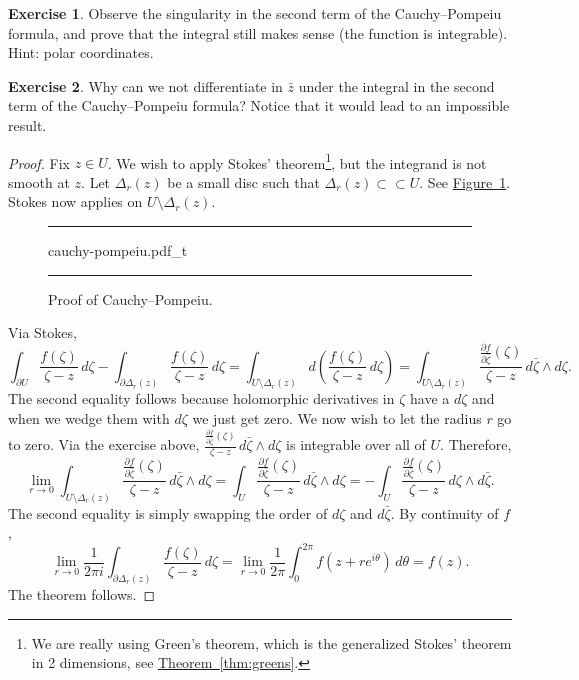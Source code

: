 \documentclass[12pt,openany]{book}
\theoremstyle{plain}
\theoremstyle{remark}
\theoremstyle{definition}
\newenvironment{exbox}{%
    \def\FrameCommand{\vrule width 1pt \relax\hspace{10pt}}%
    \MakeFramed{\advance\hsize-\width\FrameRestore}%
}{%
    \endMakeFramed
}
\newenvironment{myfig}{%
\begin{figure}[h!t]
\noindent\rule{\textwidth}{0.5pt}\vspace{12pt}\par\centering}%
{\par\noindent\rule{\textwidth}{0.5pt}
\end{figure}}
\theoremstyle{exercise}
\newtheorem{exercise}{Exercise}[section]
\theoremstyle{example}
\newcommand{\figureref}[1]{\hyperref[#1]{Figure~\ref*{#1}}}
\newcommand{\thmref}[1]{\hyperref[#1]{Theorem~\ref*{#1}}}
\begin{document}
\begin{exbox}
\begin{exercise}
Observe the singularity in the second term of the Cauchy--Pompeiu formula,
and prove that the integral still makes
sense (the function is integrable).  Hint: polar coordinates.
\end{exercise}

\begin{exercise}
Why can we not differentiate in $\bar{z}$ under the integral in the second
term of the Cauchy--Pompeiu formula?
Notice that it would lead to an impossible result.
\end{exercise}
\end{exbox}

\begin{proof}
Fix $z \in U$.  We wish to apply Stokes' theorem\footnote{%
We are really using Green's theorem, which is the generalized
Stokes' theorem in 2 dimensions, see \thmref{thm:greens}.},
but the integrand is not smooth at $z$.
Let $\Delta_r(z)$ be a small disc such that
$\Delta_r(z) \subset
\subset U$.  See \figureref{fig:cauchy-pompeiu}.
Stokes now applies on $U \setminus \Delta_r(z)$.

\begin{myfig}
{cauchy-pompeiu.pdf_t}
\caption{Proof of Cauchy--Pompeiu.\label{fig:cauchy-pompeiu}}
\end{myfig}

Via Stokes,
\begin{equation*}
\int_{\partial U} \frac{f(\zeta)}{\zeta-z}\,  d\zeta - 
\int_{\partial \Delta_r(z)} \frac{f(\zeta)}{\zeta-z}\,  d\zeta
=
\int_{U \setminus \Delta_r(z)} d\left( \frac{f(\zeta)}{\zeta-z} \, d\zeta \right)
=
\int_{U \setminus \Delta_r(z)} \frac{\frac{\partial f}{\partial
\bar{\zeta}}(\zeta)}{\zeta-z} \, d\bar{\zeta} \wedge d\zeta .
\end{equation*}
The second equality follows because holomorphic derivatives in $\zeta$
have a $d\zeta$ and when we wedge them with $d\zeta$ we just get zero.
We now wish to let the radius $r$ go to zero.
Via the exercise above,
$\frac{\frac{\partial f}{\partial \bar{\zeta}}(\zeta)}{\zeta-z} \, d\bar{\zeta} \wedge d\zeta$
is integrable over all of $U$.  Therefore,
\begin{equation*}
\lim_{r \to 0}
\int_{U \setminus \Delta_r(z)} \frac{\frac{\partial f}{\partial
\bar{\zeta}}(\zeta)}{\zeta-z} \, d\bar{\zeta} \wedge d\zeta
=
\int_{U} \frac{\frac{\partial f}{\partial
\bar{\zeta}}(\zeta)}{\zeta-z} \, d\bar{\zeta} \wedge d\zeta
=
-
\int_{U} \frac{\frac{\partial f}{\partial
\bar{\zeta}}(\zeta)}{\zeta-z} \, d\zeta \wedge d\bar{\zeta} .
\end{equation*}
The second equality is simply swapping the order of $d\zeta$ and
$d\bar{\zeta}$.
By continuity of $f$,
\begin{equation*}
\lim_{r \to 0}
\frac{1}{2\pi i}
\int_{\partial \Delta_r(z)} \frac{f(\zeta)}{\zeta-z}\,  d\zeta
=
\lim_{r \to 0}
\frac{1}{2\pi}
\int_0^{2\pi} f(z + r e^{i\theta})\, d\theta
=
f(z) .
\end{equation*}
The theorem follows.
\end{proof}
\end{document}
